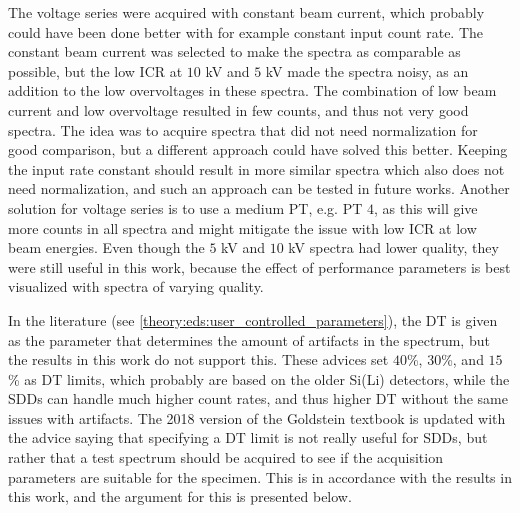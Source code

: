 The voltage series were acquired with constant beam current, which probably could have been done better with for example constant input count rate.
The constant beam current was selected to make the spectra as comparable as possible, but the low ICR at $10$ kV and $5$ kV made the spectra noisy, as an addition to the low overvoltages in these spectra.
The combination of low beam current and low overvoltage resulted in few counts, and thus not very good spectra.
The idea was to acquire spectra that did not need normalization for good comparison, but a different approach could have solved this better.
Keeping the input rate constant should result in more similar spectra which also does not need normalization, and such an approach can be tested in future works.
Another solution for voltage series is to use a medium PT, e.g. PT $4$, as this will give more counts in all spectra and might mitigate the issue with low ICR at low beam energies.
Even though the $5$ kV and $10$ kV spectra had lower quality, they were still useful in this work, because the effect of performance parameters is best visualized with spectra of varying quality.


In the literature \cite{astm_e1508_eds_quantification,iso_quantification_22309,newbury_deadtime_2014} (see \cref{theory:eds:user_controlled_parameters}), the DT is given as the parameter that determines the amount of artifacts in the spectrum, but the results in this work do not support this.
These advices set $40$\%, $30$\%, and $15$\% as DT limits, which probably are based on the older Si(Li) detectors, while the SDDs can handle much higher count rates, and thus higher DT without the same issues with artifacts.
The 2018 version of the Goldstein textbook \cite{goldstein_scanning_2018} is updated with the advice saying that specifying a DT limit is not really useful for SDDs, but rather that a test spectrum should be acquired to see if the acquisition parameters are suitable for the specimen.
This is in accordance with the results in this work, and the argument for this is presented below. 

